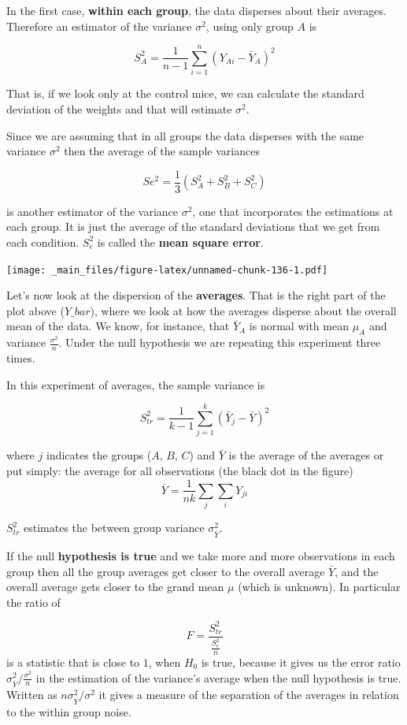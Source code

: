 \documentclass[
]{book}
\begin{document}
In the first case, \textbf{within each group}, the data disperses about their averages. Therefore an estimator of the variance \(\sigma^2\), using only
group \(A\) is

\[S_A^2=\frac{1}{n-1} \sum_{i=1}^n (Y_{Ai}-\bar{Y}_{A})^2\]

That is, if we look only at the control mice, we can calculate the standard deviation of the weights and that will estimate \(\sigma^2\).

Since we are assuming that in all groups the data disperses with the same variance \(\sigma^2\) then the average of the sample variances

\[Se^2 = \frac{1}{3}(S_A^2+S_B^2+S_C^2)\]

is another estimator of the variance \(\sigma^2\), one that incorporates the estimations at each group. It is just the average of the standard deviations that we get from each condition. \(S_e^2\) is called the \textbf{mean square error}.

\texttt{[image: \_main\_files/figure-latex/unnamed-chunk-136-1.pdf]}

Let's now look at the dispersion of the \textbf{averages}. That is the right part of the plot above (\(Y\_bar\)), where we look at how the averages disperse about the overall mean of the data. We know, for instance, that \(\bar{Y}_A\) is normal with mean \(\mu_A\) and variance \(\frac{\sigma^2}{n}\). Under the null hypothesis we are repeating this experiment three times.

In this experiment of averages, the sample variance is

\[S^2_{tr}=\frac{1}{k-1} \sum_{j=1}^k(\bar{Y}_{j}-\bar{Y})^2\]

where \(j\) indicates the groups (\(A\), \(B\), \(C\)) and \(\bar{Y}\) is the average of the averages or put simply: the average for all observations (the black dot in the figure) \[\bar{Y}=\frac{1}{nk}\sum_j \sum_i Y_{ji}\]

\(S^2_{tr}\) estimates the between group variance \(\sigma^2_{\bar{Y}}\).

If the null \textbf{hypothesis is true} and we take more and more observations in each group then all the group averages get closer to the overall average \(\bar{Y}\), and the overall average gets closer to the grand mean \(\mu\) (which is unknown). In particular the ratio of

\[F=\frac{S_{tr}^2}{\frac{S_e^2}{n}}\]
is a statistic that is close to \(1\), when \(H_0\) is true, because it gives us the error ratio \(\sigma^2_{\bar{Y}}/\frac{\sigma^2}{n}\) in the estimation of the variance's average when the null hypothesis is true. Written as \(n \sigma^2_{\bar{Y}}/\sigma^2\) it gives a measure of the separation of the averages in relation to the within group noise.
\end{document}
